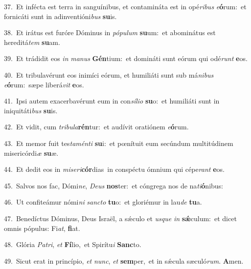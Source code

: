 {\numbfont\textcolor{\numbcolor}{37.}}~Et infécta est terra in sanguínibus, et contamináta est in opé\-\textit{ri}\-\textit{bus} \textit{e}\-\textbf{ó}rum:~\star et fornicáti sunt in adinventióni\textit{bus} \textbf{su}\-is.\par
{\numbfont\textcolor{\numbcolor}{38.}}~Et irátus est furóre Dóminus in \textit{pó}\-\textit{pu}\textit{lum} \textbf{su}\-um:~\star et abominátus est hereditá\textit{tem} \textbf{su}\-am.\par
{\numbfont\textcolor{\numbcolor}{39.}}~Et trádidit eos \textit{in} \textit{ma}\-\textit{nus} \textbf{Gén}\-tium:~\star et domináti sunt eórum qui odé\textit{runt} \textbf{e}\-os.\par
{\numbfont\textcolor{\numbcolor}{40.}}~Et tribulavérunt eos inimíci eórum, et humiliáti sunt sub má\-\textit{ni}\-\textit{bus} \textit{e}\-\textbf{ó}rum:~\star sæpe liberá\textit{vit} \textbf{e}\-os.\par
{\numbfont\textcolor{\numbcolor}{41.}}~Ipsi autem exacerbavérunt eum in con\-\textit{sí}\-\textit{li}\textit{o} \textbf{su}\-o:~\star et humiliáti sunt in iniquitáti\textit{bus} \textbf{su}\-is.\par
{\numbfont\textcolor{\numbcolor}{42.}}~Et vidit, cum \textit{tri}\-\textit{bu}\textit{la}\textbf{rén}tur:~\star et audívit oratiónem \textit{e}\-\textbf{ó}rum.\par
{\numbfont\textcolor{\numbcolor}{43.}}~Et memor fuit tes\-\textit{ta}\-\textit{mén}\textit{ti} \textbf{su}\-i:~\star et pœnítuit eum secúndum multitúdinem misericórdi\textit{æ} \textbf{su}\-æ.\par
{\numbfont\textcolor{\numbcolor}{44.}}~Et dedit eos in \textit{mi}\-\textit{se}\textit{ri}\textbf{cór}dias~\star in conspéctu ómnium qui cépe\textit{rant} \textbf{e}\-os.\par
{\numbfont\textcolor{\numbcolor}{45.}}~Salvos nos fac, Dómi\-\textit{ne}\-, \textit{De}\-\textit{us} \textbf{nos}\-ter:~\star et cóngrega nos de na\-\textit{ti}\-\textbf{ó}nibus:\par
{\numbfont\textcolor{\numbcolor}{46.}}~Ut confiteámur nómi\textit{ni} \textit{sanc}\-\textit{to} \textbf{tu}\-o:~\star et gloriémur in lau\textit{de} \textbf{tu}\-a.\par
{\numbfont\textcolor{\numbcolor}{47.}}~Benedíctus Dóminus, Deus Israël, a sǽculo et \textit{us}\-\textit{que} \textit{in} \textbf{sǽ}\-culum:~\star et dicet omnis pópulus: Fi\-\textit{at}\-, \textbf{fi}\-at.\par
{\numbfont\textcolor{\numbcolor}{48.}}~Glória \textit{Pa}\-\textit{tri}, \textit{et} \textbf{Fí}\-lio,~\star et Spirítu\textit{i} \textbf{Sanc}\-to.\par
{\numbfont\textcolor{\numbcolor}{49.}}~Sicut erat in princípio, \textit{et} \textit{nunc}\-, \textit{et} \textbf{sem}\-per,~\star et in sǽcula sæculó\-\textit{rum}\-. \textbf{A}\-men.\par
